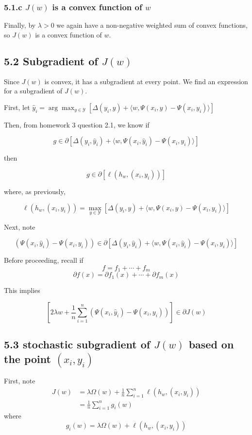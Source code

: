 \documentclass[paper=a4, fontsize=11pt]{scrartcl} %
\numberwithin{equation}{section} %
\numberwithin{figure}{section} %
\numberwithin{table}{section} %
\begin{document}
\subsubsection*{5.1.c $J(w)$ is a convex function of $w$}

Finally, by $\lambda > 0$ we again have a non-negative weighted sum of convex functions, so $J(w)$ is a convex function of $w$.

\subsection*{5.2 Subgradient of $J(w)$}

Since $J(w)$ is convex, it has a subgradient at every point. We find an expression for a subgradient of $J(w)$.

First, let $\hat{y}_i = \arg \max_{y \in \mathcal{Y}} [\Delta(y_i,y) + \langle w, \Psi(x_i, y) - \Psi(x_i, y_i) \rangle ]$

Then, from homework 3 question 2.1, we know if

\[g \in \partial [\Delta(y_i, \hat{y}_i) + \langle w, \Psi(x_i, \hat{y}_i) - \Psi(x_i, y_i) \rangle ]\]

then

\[g \in \partial [\ell(h_w, (x_i, y_i)) ]\]

where, as previously,

\[\ell(h_w, (x_i, y_i)) = \max_{y \in \mathcal{Y}} [\Delta(y_i,y) + \langle w, \Psi(x_i, y) - \Psi(x_i, y_i) \rangle ]\]

Next, note

\[(\Psi(x_i, \hat{y}_i) - \Psi(x_i, y_i)) \in \partial [\Delta(y_i, \hat{y}_i) + \langle w, \Psi(x_i, \hat{y}_i) - \Psi(x_i, y_i) \rangle ]\]

Before proceeding, recall if
\[f = f_1 + \cdots + f_m\]
\[\partial f(x) = \partial f_1(x) + \cdots + \partial f_m(x)\]

This implies

\[\left[2\lambda w + \frac{1}{n} \sum_{i = 1}^n \left(\Psi(x_i, \hat{y}_i) - \Psi(x_i, y_i)\right) \right]\in \partial J(w)\]

\subsection*{5.3 stochastic subgradient of $J(w)$ based on the point $(x_i, y_i)$}

First, note
\begin{align*}
J(w) &= \lambda \Omega(w) + \frac{1}{n} \sum_{i = 1}^n \ell(h_w, (x_i, y_i)) \\
	&= \frac{1}{n} \sum_{i = 1}^n g_i(w)
\end{align*}
where
\[g_i(w) = \lambda \Omega(w) + \ell(h_w, (x_i, y_i))\]
\end{document}
